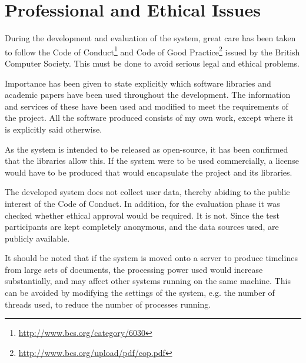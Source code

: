 \chapter{Professional and Ethical Issues}
\par During the development and evaluation of the system, great care has been taken to follow the Code of Conduct\footnote{\url{http://www.bcs.org/category/6030}} and Code of Good Practice\footnote{\url{http://www.bcs.org/upload/pdf/cop.pdf}} issued by the British Computer Society. This must be done to avoid serious legal and ethical problems.

\par Importance has been given to state explicitly which software libraries and academic papers have been used throughout the development. The information and services of these have been used and modified to meet the requirements of the project. All the software produced consists of my own work, except where it is explicitly said otherwise. 

\par As the system is intended to be released as open-source, it has been confirmed that the libraries allow this. If the system were to be used commercially, a license would have to be produced that would encapsulate the project and its libraries.

\par The developed system does not collect user data, thereby abiding to the public interest of the Code of Conduct. In addition, for the evaluation phase it was checked whether ethical approval would be required. It is not. Since the test participants are kept completely anonymous, and the data sources used, are publicly available.

\par It should be noted that if the system is moved onto a server to produce timelines from large sets of documents, the processing power used would increase substantially, and may affect other systems running on the same machine. This can be avoided by modifying the settings of the system, e.g. the number of threads used, to reduce the number of processes running.

